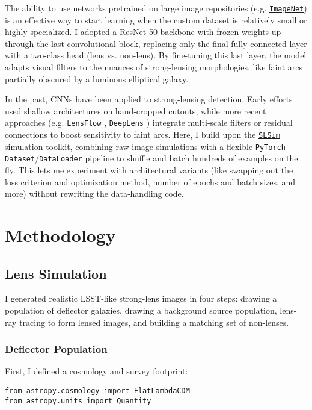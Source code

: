 \documentclass[trackchanges,twocolumn]{aastex7}
\begin{document}
The ability to use networks pretrained on large image repositories (e.g. \href{https://www.image-net.org/}{\tt\string ImageNet}) is an effective way to start learning when the custom dataset is relatively small or highly specialized. I adopted a ResNet-50 backbone with frozen weights up through the last convolutional block, replacing only the final fully connected layer with a two-class head (lens vs. non-lens). By fine-tuning this last layer, the model adapts visual filters to the nuances of strong-lensing morphologies, like faint arcs partially obscured by a luminous elliptical galaxy.

In the past, CNNs have been applied to strong‐lensing detection. Early efforts used shallow architectures on hand‐cropped cutouts, while more recent approaches (e.g. {\tt\string LensFlow} \citep{pourrahmani2018}, {\tt\string DeepLens} \citep{lanusse2018}) integrate multi‐scale filters or residual connections to boost sensitivity to faint arcs. Here, I build upon the \href{https://github.com/LSST-strong-lensing/slsim/tree/main}{\tt\string SLSim} simulation toolkit, combining raw image simulations with a flexible {\tt\string PyTorch Dataset}/{\tt\string DataLoader} pipeline to shuffle and batch hundreds of examples on the fly. This lets me experiment with architectural variants (like swapping out the loss criterion and optimization method, number of epochs and batch sizes, and more) without rewriting the data‐handling code.


\section{Methodology} \label{sec:methodology}


\subsection{Lens Simulation}

I generated realistic LSST-like strong-lens images in four steps: drawing a population of deflector galaxies, drawing a background source population, lens-ray tracing to form lensed images, and building a matching set of non-lenses.


\subsubsection{Deflector Population}

First, I defined a cosmology and survey footprint:
\begin{verbatim}
from astropy.cosmology import FlatLambdaCDM
from astropy.units import Quantity
\end{verbatim}
\end{document}
